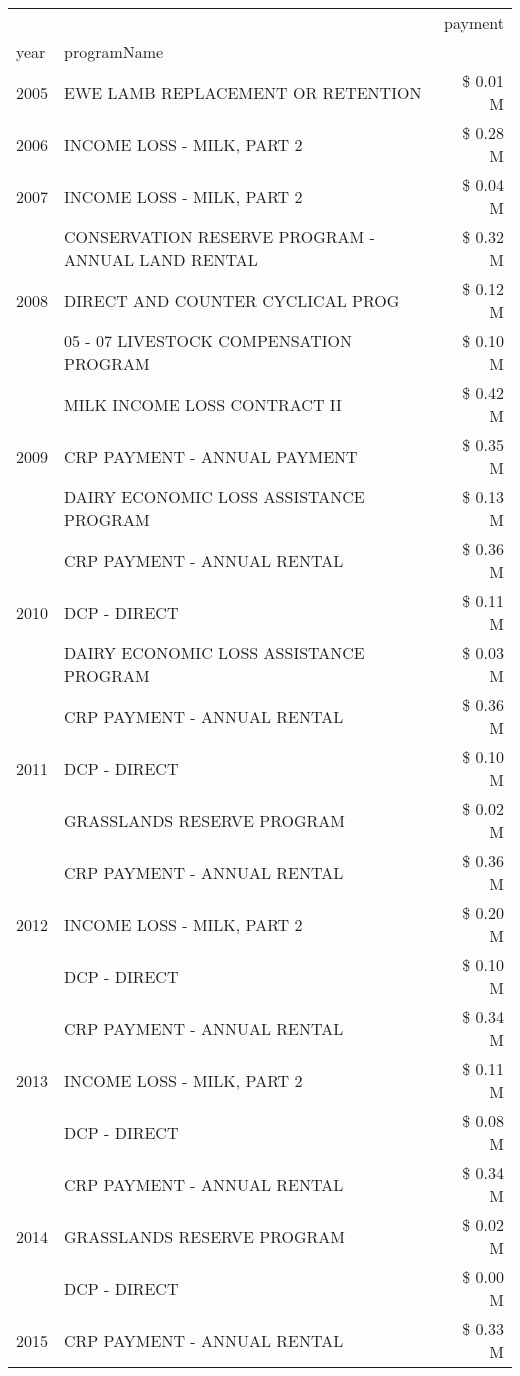 \begin{tabular}{llr}
\toprule
 &  & payment \\
year & programName &  \\
\midrule
2005 & EWE LAMB REPLACEMENT OR RETENTION & \$ 0.01 M \\
\cline{1-3}
2006 & INCOME LOSS - MILK, PART 2 & \$ 0.28 M \\
\cline{1-3}
2007 & INCOME LOSS - MILK, PART 2 & \$ 0.04 M \\
\cline{1-3}
\multirow[t]{3}{*}{2008} & CONSERVATION RESERVE PROGRAM - ANNUAL LAND RENTAL & \$ 0.32 M \\
 & DIRECT AND COUNTER CYCLICAL PROG & \$ 0.12 M \\
 & 05 - 07 LIVESTOCK COMPENSATION PROGRAM & \$ 0.10 M \\
\cline{1-3}
\multirow[t]{3}{*}{2009} & MILK INCOME LOSS CONTRACT II & \$ 0.42 M \\
 & CRP PAYMENT - ANNUAL PAYMENT & \$ 0.35 M \\
 & DAIRY ECONOMIC LOSS ASSISTANCE PROGRAM & \$ 0.13 M \\
\cline{1-3}
\multirow[t]{3}{*}{2010} & CRP PAYMENT - ANNUAL RENTAL & \$ 0.36 M \\
 & DCP - DIRECT & \$ 0.11 M \\
 & DAIRY ECONOMIC LOSS ASSISTANCE PROGRAM & \$ 0.03 M \\
\cline{1-3}
\multirow[t]{3}{*}{2011} & CRP PAYMENT - ANNUAL RENTAL & \$ 0.36 M \\
 & DCP - DIRECT & \$ 0.10 M \\
 & GRASSLANDS RESERVE PROGRAM & \$ 0.02 M \\
\cline{1-3}
\multirow[t]{3}{*}{2012} & CRP PAYMENT - ANNUAL RENTAL & \$ 0.36 M \\
 & INCOME LOSS - MILK, PART 2 & \$ 0.20 M \\
 & DCP - DIRECT & \$ 0.10 M \\
\cline{1-3}
\multirow[t]{3}{*}{2013} & CRP PAYMENT - ANNUAL RENTAL & \$ 0.34 M \\
 & INCOME LOSS - MILK, PART 2 & \$ 0.11 M \\
 & DCP - DIRECT & \$ 0.08 M \\
\cline{1-3}
\multirow[t]{3}{*}{2014} & CRP PAYMENT - ANNUAL RENTAL & \$ 0.34 M \\
 & GRASSLANDS RESERVE PROGRAM & \$ 0.02 M \\
 & DCP - DIRECT & \$ 0.00 M \\
\cline{1-3}
\multirow[t]{3}{*}{2015} & CRP PAYMENT - ANNUAL RENTAL & \$ 0.33 M \\

\end{tabular}
